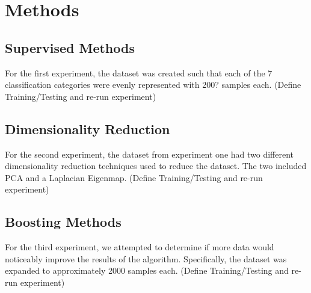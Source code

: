 \section{Methods}

\subsection{Supervised Methods}
For the first experiment, the dataset was created such that each of the 7 classification categories were evenly represented with 200? samples each.  (Define Training/Testing and re-run experiment)
\subsection{Dimensionality Reduction}
For the second experiment, the dataset from experiment one had two different dimensionality reduction techniques used to reduce the dataset.  The two included PCA and a Laplacian Eigenmap.  (Define Training/Testing and re-run experiment)
\subsection{Boosting Methods}
For the third experiment, we attempted to determine if more data would noticeably improve the results of the algorithm.  Specifically, the dataset was expanded to approximately 2000 samples each. (Define Training/Testing and re-run experiment)
